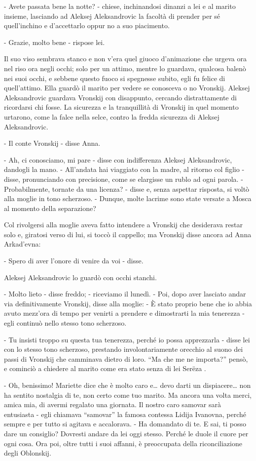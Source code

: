 - Avete passata bene la notte? - chiese, inchinandosi dinanzi a lei e al marito insieme, lasciando ad Aleksej Aleksandrovic la facoltà di prender per sé quell'inchino e d'accettarlo oppur no a suo piacimento. 

- Grazie, molto bene - rispose lei. 

Il suo viso sembrava stanco e non v'era quel giuoco d'animazione che urgeva ora nel riso ora negli occhi; solo per un attimo, mentre lo guardava, qualcosa balenò nei suoi occhi, e sebbene questo fuoco si spegnesse subito, egli fu felice di quell'attimo. Ella guardò il marito per vedere se conosceva o no Vronskij. Aleksej Aleksandrovic guardava Vronskij con disappunto, cercando distrattamente di ricordarsi chi fosse. La sicurezza e la tranquillità di Vronskij in quel momento urtarono, come la falce nella selce, contro la fredda sicurezza di Aleksej Aleksandrovic. 

- Il conte Vronskij - disse Anna. 

- Ah, ci conosciamo, mi pare - disse con indifferenza Aleksej Aleksandrovic, dandogli la mano. - All'andata hai viaggiato con la madre, al ritorno col figlio - disse, pronunciando con precisione, come se elargisse un rublo ad ogni parola. - Probabilmente, tornate da una licenza? - disse e, senza aspettar risposta, si voltò alla moglie in tono scherzoso. - Dunque, molte lacrime sono state versate a Mosca al momento della separazione? 

Col rivolgersi alla moglie aveva fatto intendere a Vronskij che desiderava restar solo e, giratosi verso di lui, si toccò il cappello; ma Vronskij disse ancora ad Anna Arkad'evna: 

- Spero di aver l'onore di venire da voi - disse. 

Aleksej Aleksandrovic lo guardò con occhi stanchi. 

- Molto lieto - disse freddo; - riceviamo il lunedì. - Poi, dopo aver lasciato andar via definitivamente Vronskij, disse alla moglie: - È stato proprio bene che io abbia avuto mezz'ora di tempo per venirti a prendere e dimostrarti la mia tenerezza - egli continuò nello stesso tono scherzoso. 

- Tu insisti troppo su questa tua tenerezza, perché io possa apprezzarla - disse lei con lo stesso tono scherzoso, prestando involontariamente orecchio al suono dei passi di Vronskij che camminava dietro di loro. ``Ma che me ne importa?'' pensò, e cominciò a chiedere al marito come era stato senza di lei Serëza . 

- Oh, benissimo! Mariette dice che è molto caro e\ldots{} devo darti un dispiacere\ldots{} non ha sentito nostalgia di te, non certo come tuo marito. Ma ancora una volta merci, amica mia, di avermi regalato una giornata. Il nostro caro samovar sarà entusiasta - egli chiamava ``samovar'' la famosa contessa Lidija Ivanovna, perché sempre e per tutto si agitava e accalorava. - Ha domandato di te. E sai, ti posso dare un consiglio? Dovresti andare da lei oggi stesso. Perché le duole il cuore per ogni cosa. Ora poi, oltre tutti i suoi affanni, è preoccupata della riconciliazione degli Oblonskij. 

